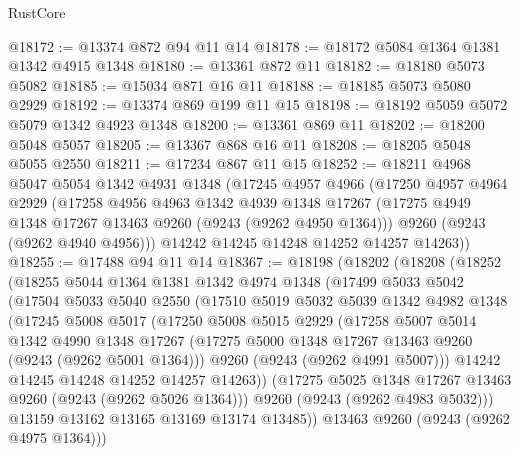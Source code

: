 \begin{lexlean}{RustCore}
\begin{coremodule}
@18172 := @13374 @872 @94 @11 @14
@18178 := @18172 @5084 @1364 @1381 @1342 @4915 @1348
@18180 := @13361 @872 @11
@18182 := @18180 @5073 @5082
@18185 := @15034 @871 @16 @11
@18188 := @18185 @5073 @5080 @2929
@18192 := @13374 @869 @199 @11 @15
@18198 := @18192 @5059 @5072 @5079 @1342 @4923 @1348
@18200 := @13361 @869 @11
@18202 := @18200 @5048 @5057
@18205 := @13367 @868 @16 @11
@18208 := @18205 @5048 @5055 @2550
@18211 := @17234 @867 @11 @15
@18252 := @18211
    @4968
    @5047
    @5054
    @1342
    @4931
    @1348
    (@17245
      @4957
      @4966
      (@17250
        @4957
        @4964
        @2929
        (@17258
          @4956
          @4963
          @1342
          @4939
          @1348
          @17267
          (@17275 @4949 @1348 @17267 @13463 @9260 (@9243 (@9262 @4950 @1364)))
          @9260
          (@9243 (@9262 @4940 @4956)))
        @14242
        @14245
        @14248
        @14252
        @14257
        @14263))
@18255 := @17488 @94 @11 @14
@18367 := @18198
    (@18202
      (@18208
        (@18252
          (@18255
            @5044
            @1364
            @1381
            @1342
            @4974
            @1348
            (@17499
              @5033
              @5042
              (@17504
                @5033
                @5040
                @2550
                (@17510
                  @5019
                  @5032
                  @5039
                  @1342
                  @4982
                  @1348
                  (@17245
                    @5008
                    @5017
                    (@17250
                      @5008
                      @5015
                      @2929
                      (@17258
                        @5007
                        @5014
                        @1342
                        @4990
                        @1348
                        @17267
                        (@17275 @5000 @1348 @17267 @13463 @9260 (@9243 (@9262 @5001 @1364)))
                        @9260
                        (@9243 (@9262 @4991 @5007)))
                      @14242
                      @14245
                      @14248
                      @14252
                      @14257
                      @14263))
                  (@17275 @5025 @1348 @17267 @13463 @9260 (@9243 (@9262 @5026 @1364)))
                  @9260
                  (@9243 (@9262 @4983 @5032)))
                @13159
                @13162
                @13165
                @13169
                @13174
                @13485))
            @13463
            @9260
            (@9243 (@9262 @4975 @1364)))

\end{coremodule}
\end{lexlean}
